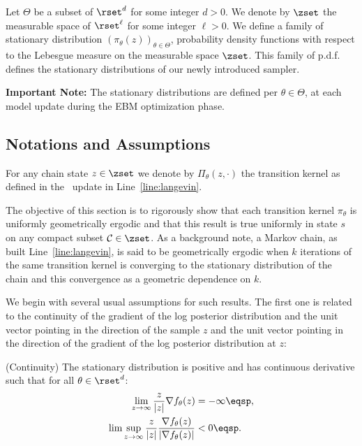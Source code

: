 \documentclass[10pt,twocolumn,letterpaper]{article}
\begin{document}
Let $\Theta$ be a subset of $\rset^d$ for some integer $d >0$.
We denote by $\zset$ the measurable space of $\rset^\ell$ for some integer $\ell >0$.
We define a family of stationary distribution $\left(\pi_\theta(z) \right)_{\theta \in \Theta}$, probability density functions with respect to the Lebesgue measure on the measurable space $\zset$. This family of p.d.f. defines the stationary distributions of our newly introduced sampler.

\textbf{Important Note:} The stationary distributions are defined per $\theta \in \Theta$, \ie at each model update during the EBM optimization phase.

\subsection{Notations and Assumptions}
For any chain state $z \in \zset$ we denote by $\Pi_\theta(z,\cdot)$ the transition kernel as defined in the \algo\ update in Line~\ref{line:langevin}.

The objective of this section is to rigorously show that each transition kernel $\pi_\theta$ is uniformly geometrically ergodic and that this result is true uniformly in state $s$ on any compact subset $\mathcal{C} \in \zset$.
As a background note, a Markov chain, as built Line~\ref{line:langevin}, is said to be geometrically ergodic when $k$ iterations of the same transition kernel is converging to the stationary distribution of the chain and this convergence as a geometric dependence on $k$.

We begin with several usual assumptions for such results.
The first one is related to the continuity of the gradient of the log posterior distribution and the unit vector pointing in the direction of the sample $z$ and the unit vector pointing in the direction of the gradient of the log posterior distribution at $z$:
\begin{assumption}\label{ass:bounded}
(Continuity) The stationary distribution is positive and has continuous derivative such that for all $\theta \in \rset^d$:
\begin{equation}\notag
\begin{split}
\lim \limits_{z \to \infty} \frac{z}{|z|} \nabla f_{\theta}(z) & = - \infty \eqsp,\\
 \lim \sup \limits_{z \to \infty} \frac{z}{|z|} \frac{\nabla f_{\theta}(z) }{|\nabla f_{\theta}(z) |} &< 0 \eqsp.
\end{split}
\end{equation}
\end{assumption}
\end{document}
